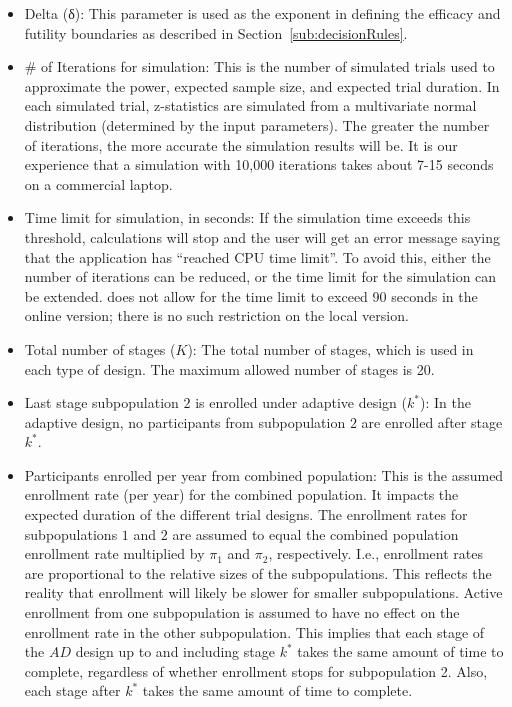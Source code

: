 \documentclass[article]{jss}
\begin{document}
\begin{itemize}

\item Delta (δ): This parameter is used as the exponent in defining the efficacy and futility boundaries as described in Section~\ref{sub:decisionRules}. %

\item \# of Iterations for simulation: This is the number of simulated trials used to 
 approximate the power, expected sample size, and expected trial duration. In each simulated trial,
 z-statistics are simulated from a multivariate normal distribution (determined by the input parameters).
The greater the number of iterations, the more accurate the simulation results will be.
It is our experience that a simulation with 10,000 iterations takes about 7-15 seconds on a commercial laptop.

\item Time limit for simulation, in seconds: If the simulation time exceeds this threshold, calculations will stop and the user will get an error message saying that the application has ``reached CPU time limit''. To avoid this, either the number of iterations can be reduced, or the time limit for the simulation can be extended.  does not allow for the time limit to exceed 90 seconds in the online version; there is no such restriction on the local version.

\item Total number of stages ($K$): The total number of stages, which is used in each type of design. The maximum allowed number of stages is 20.

\item Last stage subpopulation $2$ is enrolled under adaptive design ($k^*$): In the adaptive design, no participants from subpopulation $2$ are enrolled after stage $k^*$. 

\item Participants enrolled per year from combined population: This is the assumed enrollment rate (per year) for the combined population. It impacts the expected duration of the different trial designs. The enrollment rates for  subpopulations $1$ and $2$ are assumed to equal the combined population enrollment rate multiplied by $π_1$ and $π_2$, respectively. I.e., enrollment rates are proportional to the relative sizes of the subpopulations. This reflects the reality that enrollment will likely be slower for smaller subpopulations.
Active enrollment from one subpopulation is assumed to have no effect on the enrollment rate in the other subpopulation. This implies that each stage of the $AD$ design up to and including stage $k^*$ takes the same amount of time to complete, regardless of whether enrollment stops for subpopulation 2. Also, each stage after $k^*$ takes the same amount of time to complete. 



\end{itemize}
\end{document}

